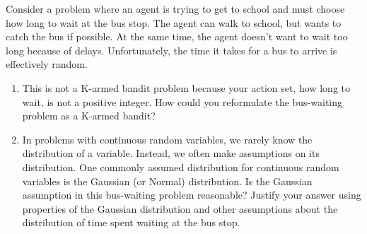 Consider a problem where an agent is trying to get to school and must choose how long to wait at the bus stop. The agent can walk to school, but wants to catch the bus if possible. At the same time, the agent doesn't want to wait too long because of delays. Unfortunately, the time it takes for a bus to arrive is effectively random.

\begin{enumerate}[label=(\alph*)]
  \item This is not a K-armed bandit problem because your action set, how long to wait, is not a positive integer. How could you reformulate the bus-waiting problem as a K-armed bandit?
  \item In problems with continuous random variables, we rarely know the distribution of a variable. Instead, we often make assumptions on its distribution. One commonly assumed distribution for continuous random variables is the Gaussian (or Normal) distribution. Is the Gaussian assumption in this bus-waiting problem reasonable? Justify your answer using properties of the Gaussian distribution and other assumptions about the distribution of time spent waiting at the bus stop.
\end{enumerate}



  
